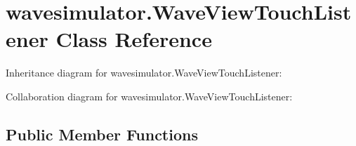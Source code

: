\hypertarget{classwavesimulator_1_1WaveViewTouchListener}{}\section{wavesimulator.\+Wave\+View\+Touch\+Listener Class Reference}
\label{classwavesimulator_1_1WaveViewTouchListener}


Inheritance diagram for wavesimulator.\+Wave\+View\+Touch\+Listener\+:


Collaboration diagram for wavesimulator.\+Wave\+View\+Touch\+Listener\+:
\subsection*{Public Member Functions}
